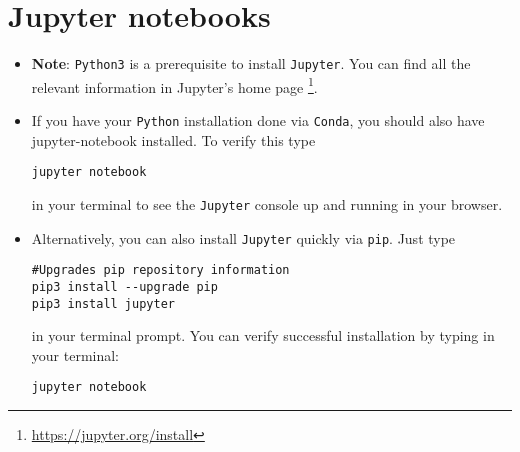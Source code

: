 \documentclass[11pt]{article}
\begin{document}
\section*{Jupyter notebooks}
\label{sec:org315c6fd}
\begin{itemize}
\item \textbf{Note}: \texttt{Python3} is a prerequisite to install \texttt{Jupyter}. You can find all the
relevant information in Jupyter's home page \footnote{\url{https://jupyter.org/install}}.
\item If you have your \texttt{Python} installation done via \texttt{Conda}, you should also have
jupyter-notebook installed. To verify this type
\begin{verbatim}
jupyter notebook
\end{verbatim}
in your terminal to see the \texttt{Jupyter} console up and running in your browser.
\item Alternatively, you can also install \texttt{Jupyter} quickly via \texttt{pip}. Just type
\begin{verbatim}
#Upgrades pip repository information
pip3 install --upgrade pip
pip3 install jupyter
\end{verbatim}
in your terminal prompt. You can verify successful installation by typing in
your terminal:
\begin{verbatim}
jupyter notebook
\end{verbatim}
\end{itemize}
\end{document}
